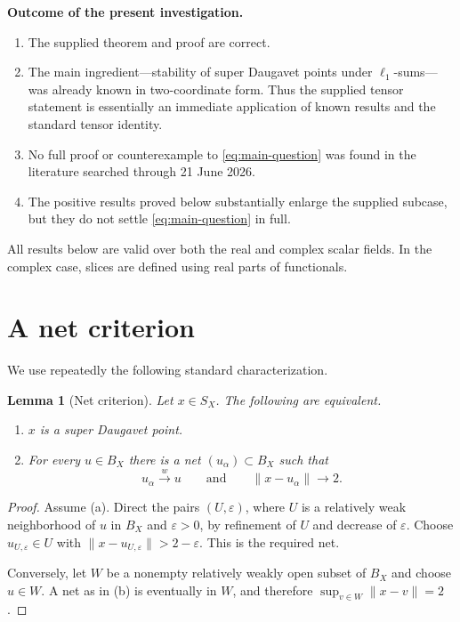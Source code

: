 \documentclass[11pt]{article}
\newtheorem{lemma}[theorem]{Lemma}
\theoremstyle{definition}
\begin{document}
\medskip
\noindent
\textbf{Outcome of the present investigation.}
\begin{enumerate}[label=(\roman*),leftmargin=2.2em]
\item The supplied theorem and proof are correct.
\item The main ingredient---stability of super Daugavet points under
      $\ell_1$-sums---was already known in two-coordinate form.  Thus the
      supplied tensor statement is essentially an immediate application of
      known results and the standard tensor identity.
\item No full proof or counterexample to \eqref{eq:main-question} was found in
      the literature searched through 21 June 2026.
\item The positive results proved below substantially enlarge the supplied
      subcase, but they do not settle \eqref{eq:main-question} in full.
\end{enumerate}

All results below are valid over both the real and complex scalar fields.  In
the complex case, slices are defined using real parts of functionals.

\section{A net criterion}\label{sec:net}

We use repeatedly the following standard characterization.

\begin{lemma}[Net criterion]\label{lem:net}
Let $x\in S_X$.  The following are equivalent.
\begin{enumerate}[label=(\alph*)]
\item $x$ is a super Daugavet point.
\item For every $u\in B_X$ there is a net $(u_\alpha)\subset B_X$ such that
\[
  u_\alpha\xrightarrow{w}u
  \qquad\text{and}\qquad
  \|x-u_\alpha\|\longrightarrow 2.
\]
\end{enumerate}
\end{lemma}

\begin{proof}
Assume (a).  Direct the pairs $(U,\varepsilon)$, where $U$ is a relatively
weak neighborhood of $u$ in $B_X$ and $\varepsilon>0$, by refinement of $U$
and decrease of $\varepsilon$.  Choose
$u_{U,\varepsilon}\in U$ with
$\|x-u_{U,\varepsilon}\|>2-\varepsilon$.  This is the required net.

Conversely, let $W$ be a nonempty relatively weakly open subset of $B_X$ and
choose $u\in W$.  A net as in (b) is eventually in $W$, and therefore
$\sup_{v\in W}\|x-v\|=2$.
\end{proof}
\end{document}
